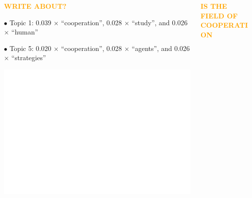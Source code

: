 \documentclass[usenames,dvipsnames,t]{beamer}
\begin{document}
\begin{columns}
\begin{column}{.33\linewidth}
\begin{center}
        \textbf{\Large\textcolor{orange}{\textsc{WRITE ABOUT?}}}
    \end{center}
    \vspace{1cm}

    \begin{center}
        
        \vspace{1cm}

        \small{
            $\bullet$ Topic 1: 0.039 $\times$ ``cooperation'', 0.028 $\times$ ``study'', and 0.026 $\times$ ``human''
            \vspace{.2cm}

            $\bullet$ Topic 5: 0.020 $\times$ ``cooperation'', 0.028 $\times$ ``agents'', and 0.026 $\times$ ``strategies''}
    \end{center}
    \vspace{1cm}

    \begin{center}
        \includegraphics[width=.6\textwidth]{static/coherence.png}
    \end{center}
    \vspace{1cm}

    \begin{center}
        
    \end{center}

    \vspace{1cm}
\end{column}
\vrule width 3pt
\begin{column}{.33\linewidth}
    \begin{center}
        \textbf{\Large\textcolor{orange}{\textsc{IS THE FIELD OF COOPERATION}}}
        \vspace{.5cm}
    

\end{center}
\end{column}
\end{columns}
\end{document}
